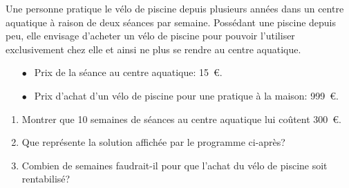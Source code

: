 
\medskip

Une personne pratique le vélo de piscine depuis plusieurs années dans un centre
aquatique à raison de deux séances par semaine. Possédant une piscine depuis peu,
elle envisage d'acheter un vélo de piscine pour pouvoir l'utiliser exclusivement chez
elle et ainsi ne plus se rendre au centre aquatique.

\medskip

\setlength\parindent{6mm}
\begin{itemize}
\item[$\bullet~~$] Prix de la séance au centre aquatique: 15~\euro.
\item[$\bullet~~$] Prix d'achat d'un vélo de piscine pour une pratique à la maison: 999~\euro.
\end{itemize}
\setlength\parindent{0mm}

\medskip

\begin{enumerate}
\item Montrer que 10 semaines de séances au centre aquatique lui coûtent 300~\euro.
\item Que représente la solution affichée par le programme ci-après?

\begin{center}
\begin{scratch}
{
}

\end{scratch}
\end{center}

\item  Combien de semaines faudrait-il pour que l'achat du vélo de piscine soit
rentabilisé?
\end{enumerate}

\bigskip

